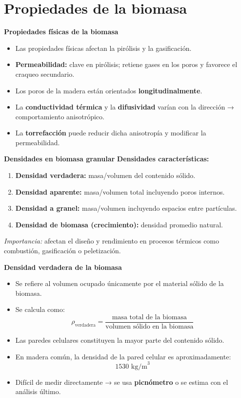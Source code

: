 \documentclass[../../main.tex]{subfiles}
\begin{document}
\section{Propiedades de la biomasa}
\begin{frame}{\textbf{Propiedades físicas de la biomasa}}
\begin{itemize}
  \item Las propiedades físicas afectan la pirólisis y la gasificación.
  \item \textbf{Permeabilidad:} clave en pirólisis; retiene gases en los poros y favorece el craqueo secundario.
  \item Los poros de la madera están orientados \textbf{longitudinalmente}.
  \item La \textbf{conductividad térmica} y la \textbf{difusividad} varían con la dirección → comportamiento anisotrópico.
  \item La \textbf{torrefacción} puede reducir dicha anisotropía y modificar la permeabilidad.
\end{itemize}
\end{frame}
\begin{frame}{\textbf{Densidades en biomasa granular}}
\textbf{Densidades características:}
\begin{enumerate}
  \item \textbf{Densidad verdadera:} masa/volumen del contenido sólido.
  \item \textbf{Densidad aparente:} masa/volumen total incluyendo poros internos.
  \item \textbf{Densidad a granel:} masa/volumen incluyendo espacios entre partículas.
  \item \textbf{Densidad de biomasa (crecimiento):} densidad promedio natural.
\end{enumerate}

\vspace{0.5em}
\textit{Importancia:} afectan el diseño y rendimiento en procesos térmicos como combustión, gasificación o peletización.
\end{frame}
\begin{frame}{\textbf{Densidad verdadera de la biomasa}}
\begin{itemize}
  \item Se refiere al volumen ocupado únicamente por el material sólido de la biomasa.
  \item Se calcula como:
  \[
  \rho_{\text{verdadera}} = \frac{\text{masa total de la biomasa}}{\text{volumen sólido en la biomasa}}
  \]
  \item Las paredes celulares constituyen la mayor parte del contenido sólido.
  \item En madera común, la densidad de la pared celular es aproximadamente:
  \[
  1530 \text{ kg/m}^3
  \]
  \item Difícil de medir directamente → se usa \textbf{picnómetro} o se estima con el análisis último.
\end{itemize}
\end{frame}
\end{document}
